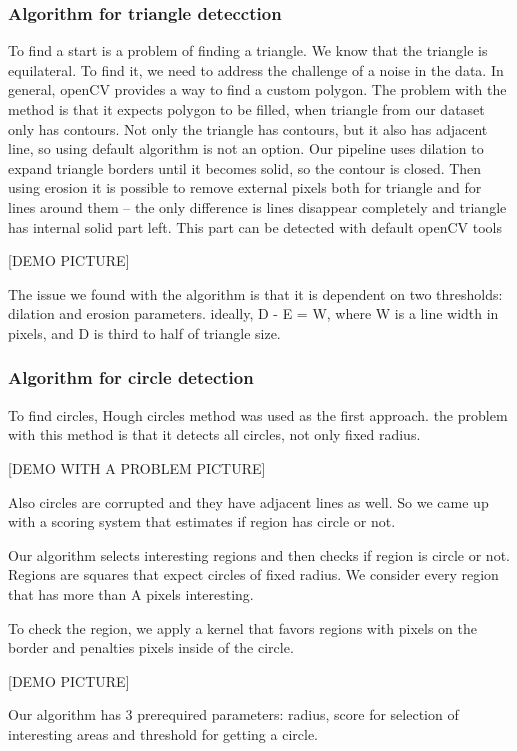 \documentclass[a4paper,12pt]{extarticle}
\begin{document}
\subsubsection{Algorithm for triangle detecction}

To find a start is a problem of finding a triangle. We know that the triangle is equilateral. To find it, we need to address the challenge of a noise in the data. In general, openCV provides a way to find a custom polygon. The problem with the method is that it expects polygon to be filled, when triangle from our dataset only has contours. Not only the triangle has contours, but it also has adjacent line, so using default algorithm is not an option.
Our pipeline uses dilation to expand triangle borders until it becomes solid, so the contour is closed. Then using erosion it is possible to remove external pixels both for triangle and for lines around them -- the only difference is lines disappear completely and triangle has internal solid part left. This part can be detected with default openCV tools 

[DEMO PICTURE]

The issue we found with the algorithm is that it is dependent on two thresholds: dilation and erosion parameters. ideally, D - E = W, where W is a line width in pixels, and D is third to half of triangle size.


\subsubsection{Algorithm for circle detection}

To find circles, Hough circles method was used as the first approach. the problem with this method is that it detects all circles, not only fixed radius. 

[DEMO WITH A PROBLEM PICTURE]

Also circles are corrupted and they have adjacent lines as well. So we came up with a scoring system that estimates if region has circle or not.

Our algorithm selects interesting regions and then checks if region is circle or not. Regions are squares that expect circles of fixed radius. We consider every region that has more than A pixels interesting.

To check the region, we apply a kernel that favors regions with pixels on the border and penalties pixels inside of the circle.

[DEMO PICTURE]

Our algorithm has 3 prerequired parameters: radius, score for selection of interesting areas and threshold for getting a circle.
\end{document}
